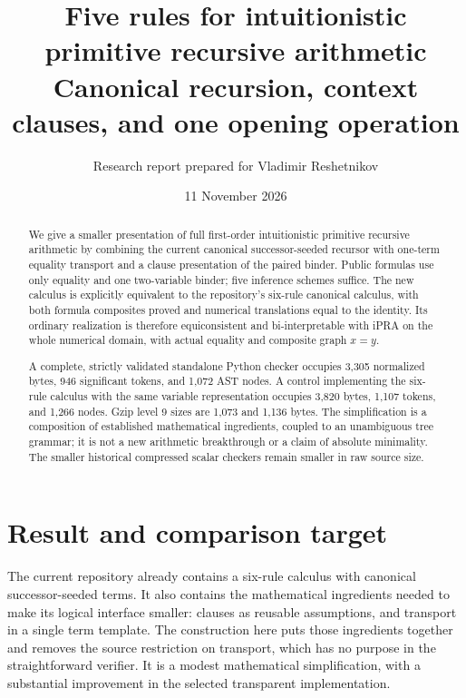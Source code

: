 \documentclass[11pt,letterpaper]{article}
\title{\textcolor{ink}{Five rules for intuitionistic\\primitive recursive arithmetic}\\[4pt]\large Canonical recursion, context clauses, and one opening operation}
\author{Research report prepared for Vladimir Reshetnikov}
\date{11 November 2026}
\theoremstyle{definition}\newtheorem{definition}[theorem]{Definition}
\begin{document}
\maketitle
\begin{abstract}
We give a smaller presentation of full first-order intuitionistic primitive recursive arithmetic by combining the current canonical successor-seeded recursor with one-term equality transport and a clause presentation of the paired binder. Public formulas use only equality and one two-variable binder; five inference schemes suffice. The new calculus is explicitly equivalent to the repository's six-rule canonical calculus, with both formula composites proved and numerical translations equal to the identity. Its ordinary realization is therefore equiconsistent and bi-interpretable with iPRA on the whole numerical domain, with actual equality and composite graph $x=y$.

A complete, strictly validated standalone Python checker occupies 3,305 normalized bytes, 946 significant tokens, and 1,072 AST nodes. A control implementing the six-rule calculus with the same variable representation occupies 3,820 bytes, 1,107 tokens, and 1,266 nodes. Gzip level 9 sizes are 1,073 and 1,136 bytes. The simplification is a composition of established mathematical ingredients, coupled to an unambiguous tree grammar; it is not a new arithmetic breakthrough or a claim of absolute minimality. The smaller historical compressed scalar checkers remain smaller in raw source size.
\end{abstract}
\setcounter{tocdepth}{1}
\tableofcontents
\newpage
\section{Result and comparison target}

The current repository already contains a six-rule calculus with canonical successor-seeded terms. It also contains the mathematical ingredients needed to make its logical interface smaller: clauses as reusable assumptions, and transport in a single term template. The construction here puts those ingredients together and removes the source restriction on transport, which has no purpose in the straightforward verifier. It is a modest mathematical simplification, with a substantial improvement in the selected transparent implementation.
\end{document}
